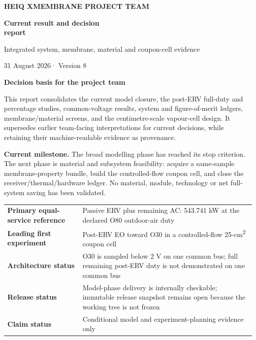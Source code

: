\documentclass[10pt,a4paper]{article}
\newcommand{\sans}{\fontfamily{qhv}\selectfont}
\newcommand{\reportdate}{31 August 2026}
\newcommand{\reportversion}{Version 8}
\begin{document}
\thispagestyle{empty}
\vspace*{7mm}
\begin{tcolorbox}[
  enhanced,colback=Navy,colframe=Navy,boxrule=0pt,arc=0mm,
  left=12mm,right=12mm,top=12mm,bottom=12mm
]
{\sans\bfseries\large\color{white}HEIQ XMEMBRANE PROJECT TEAM}\par
\vspace{8mm}
{\sans\bfseries\fontsize{28}{32}\selectfont\color{white}
Current result and decision\\[-1mm]
report}\par
\vspace{2mm}
{\sans\fontsize{18}{21}\selectfont\color{white}
Integrated system, membrane, material and coupon-cell evidence}\par
\vspace{7mm}
{\sans\large\color{white}\reportdate\quad · \quad\reportversion}
\end{tcolorbox}

\vspace{10mm}
{\sans\bfseries\Large\color{Navy}Decision basis for the project team}\par
\vspace{4mm}

This report consolidates the current model closure, the post-ERV full-duty
and percentage studies, common-voltage results, system and figure-of-merit
ledgers, membrane/material screens, and the centimetre-scale vapour-cell
design. It supersedes earlier team-facing interpretations for current
decisions, while retaining their machine-readable evidence as provenance.

\begin{mainbox}
\textbf{Current milestone.} The broad modelling phase has reached its stop
criterion. The next phase is material and subsystem feasibility: acquire a
same-sample membrane-property bundle, build the controlled-flow coupon cell,
and close the receiver/thermal/hardware ledger. No material, module,
technology or net full-system saving has been validated.
\end{mainbox}

\vfill
\begin{tabularx}{\textwidth}{@{}lY@{}}
\textbf{Primary equal-service reference} & Passive ERV plus remaining AC:
543.741 kW at the declared O80 outdoor-air duty \\
\textbf{Leading first experiment} & Post-ERV EO toward O30 in a controlled-flow
25-cm\textsuperscript{2} coupon cell \\
\textbf{Architecture status} & O30 is sampled below 2 V on one common bus;
full remaining post-ERV duty is not demonstrated on one common bus \\
\textbf{Release status} & Model-phase delivery is internally checkable;
immutable release snapshot remains open because the working tree is not frozen \\
\textbf{Claim status} & Conditional model and experiment-planning evidence only \\
\end{tabularx}
\end{document}
